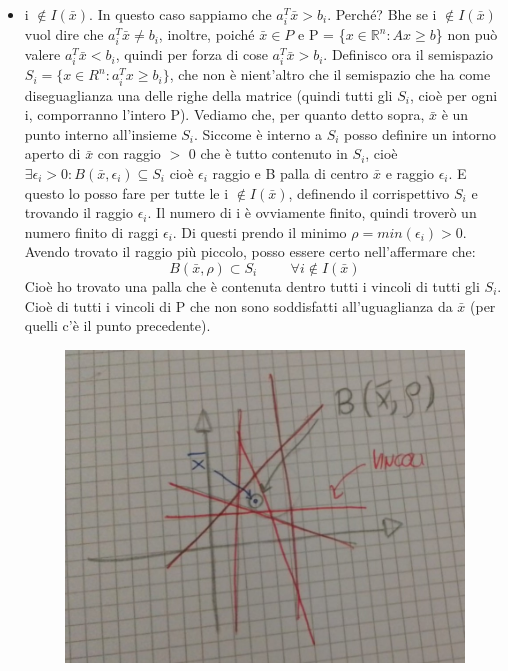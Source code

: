 \begin{itemize}
    \item i $\notin I(\bar{x})$. In questo caso sappiamo che $a_i^T\bar{x} > b_i$. Perché? Bhe se i $\notin I(\bar{x})$ vuol dire che $a_i^T\bar{x} \neq b_i$, inoltre, poiché $\bar{x} \in P$ e P = \{$x \in \mathbb{R}^n: Ax \geq b$\} non può valere $a_i^T\bar{x} < b_i$, quindi per forza di cose $a_i^T\bar{x} > b_i$. Definisco ora il semispazio $S_i = \{x \in R^n: a_i^Tx \geq b_i\}$, che non è nient'altro che il semispazio che ha come diseguaglianza una delle righe della matrice (quindi tutti gli $S_i$, cioè per ogni i, comporranno l'intero P). Vediamo che, per quanto detto sopra, $\bar{x}$ è un punto interno all'insieme $S_i$. Siccome è interno a $S_i$ posso definire un intorno aperto di $\bar{x}$ con raggio $>$ 0 che è tutto contenuto in $S_i$, cioè $\exists \epsilon_i > 0 : B(\bar{x}, \epsilon_i) \subseteq S_i$ cioè $\epsilon_i$ raggio e B palla di centro $\bar{x}$ e raggio $\epsilon_i$. E questo lo posso fare per tutte le i $\notin I(\bar{x})$, definendo il corrispettivo $S_i$ e trovando il raggio $\epsilon_i$. Il numero di i è ovviamente finito, quindi troverò un numero finito di raggi $\epsilon_i$. Di questi prendo il minimo $\rho = min(\epsilon_i) > 0$. Avendo trovato il raggio più piccolo, posso essere certo nell'affermare che:
    \begin{equation*}
        B(\bar{x}, \rho) \subset S_i \hspace{1cm} \forall i \notin I(\bar{x})
    \end{equation*}
    Cioè ho trovato una palla che è contenuta dentro tutti i vincoli di tutti gli $S_i$. Cioè di tutti i vincoli di P che non sono soddisfatti all'uguaglianza da $\bar{x}$ (per quelli c'è il punto precedente).
    \begin{figure}[h!]
        \centering
        \includegraphics[scale=0.3]{pallarho.jpeg}

\end{figure}
\end{itemize}
